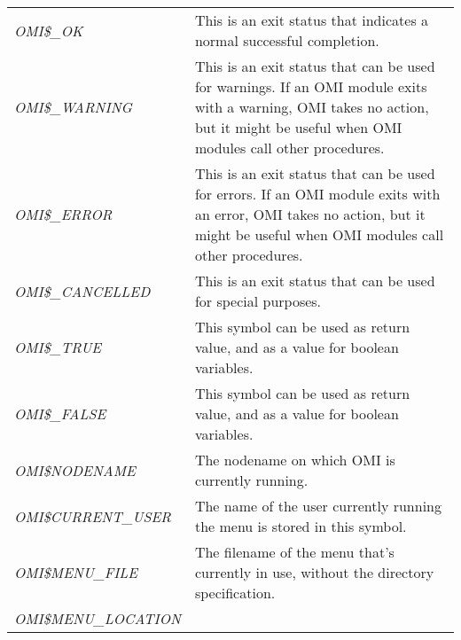 \documentclass[a4paper]{book}
\begin{document}
\begin{table}[h!tb]
\begin{minipage}[h!tb]{\textwidth}
\begin{tabular}{lp{9cm}} \hline
\textsl{OMI{\$}{\_}OK}\index{return values}\index{OMI{\$}{\_}OK}\index{OMI symbols!local symbols!OMI{\$}{\_}OK} & 
This is an exit status that indicates a normal successful completion. \\
\textsl{OMI{\$}{\_}WARNING}\index{return values}\index{OMI{\$}{\_}WARNING}\index{OMI symbols!local symbols!OMI{\$}{\_}WARNING} & 
This is an exit status that can be used for warnings. If an 
OMI module exits with a warning, OMI takes no action, but 
it might be useful when OMI modules call other procedures. \\
\textsl{OMI{\$}{\_}ERROR}\index{return values}\index{OMI{\$}{\_}ERROR}\index{OMI symbols!local symbols!OMI{\$}{\_}ERROR} & 
This is an exit status that can be used for errors. If an OMI 
module exits with an error, OMI takes no action, but it 
might be useful when OMI modules call other procedures. \\
\textsl{OMI{\$}{\_}CANCELLED}\index{return values}\index{OMI{\$}{\_}CANCELLED}\index{OMI symbols!local symbols!OMI{\$}{\_}CANCELLED} & 
This is an exit status that can be used for special purposes. \\
\textsl{OMI{\$}{\_}TRUE}\index{OMI{\$}{\_}TRUE}\index{OMI symbols!local symbols!OMI{\$}{\_}TRUE} & 
This symbol can be used as return value, and as a value for boolean variables. \\
\textsl{OMI{\$}{\_}FALSE}\index{OMI{\$}{\_}FALSE}\index{OMI symbols!local symbols!OMI{\$}{\_}FALSE} & 
This symbol can be used as return value, and as a value for boolean variables. \\
\textsl{OMI{\$}NODENAME}\index{nodename}\index{OMI{\$}NODENAME}\index{OMI{\$}NODENAME} & 
The nodename on which OMI is currently running. \\
\textsl{OMI{\$}CURRENT{\_}USER}\index{username}\index{OMI{\$}CURRENT{\_}USER}\index{OMI symbols!local symbols!OMI{\$}CURRENT{\_}USER} & 
The name of the user currently running the menu is stored in this symbol. \\
\textsl{OMI{\$}MENU{\_}FILE}\index{menu!filename}\index{OMI{\$}MENU{\_}FILE}\index{OMI symbols!local symbols!OMI{\$}MENU{\_}FILE} & 
The filename of the menu that's currently in use, without the directory specification. \\
\textsl{OMI{\$}MENU{\_}LOCATION}\index{OMI{\$}MENU{\_}LOCATION}\index{OMI symbols!local symbols!OMI{\$}MENU{\_}LOCATION} & 

\end{tabular}
\end{minipage}
\end{table}
\end{document}
